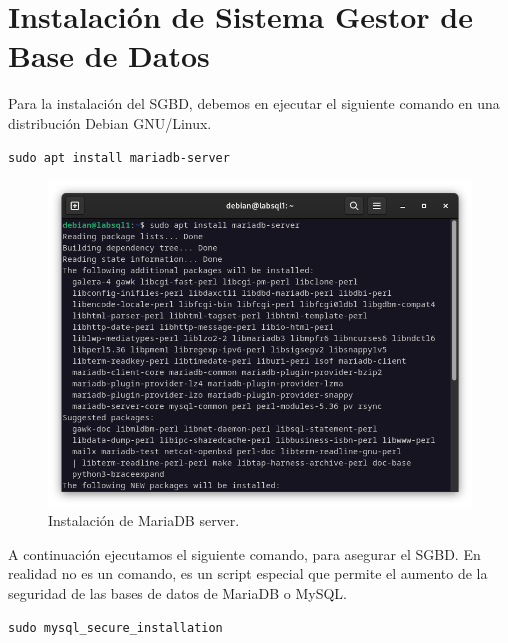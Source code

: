 
\section{Instalación de Sistema Gestor de Base de Datos}

Para la instalación del SGBD, debemos en ejecutar el siguiente comando en una distribución Debian GNU/Linux.

\begin{lstlisting}[style=mybash]
sudo apt install mariadb-server
\end{lstlisting}

\begin{figure}[H]
	\centering
	\includegraphics[scale=0.30]{00}
	\caption{Instalación de MariaDB server.}
\end{figure}


A continuación ejecutamos el siguiente comando, para asegurar el SGBD. En realidad no es un comando, es un script especial que permite el aumento de la seguridad de las bases de datos de MariaDB o MySQL.

\begin{lstlisting}[style=mybash]
sudo mysql_secure_installation
\end{lstlisting}

